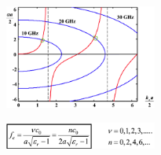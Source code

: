 \documentclass[english]{latex4ei/latex4ei_sheet}
\begin{document}
\begin{sectionbox}
    \begin{center}\includegraphics[width = 5cm]{./img/dielektr-g2.png}\end{center}
    \begin{center}\includegraphics[width = 5cm]{./img/dielektr-gfc.png}\end{center}

\end{sectionbox}
\end{document}
